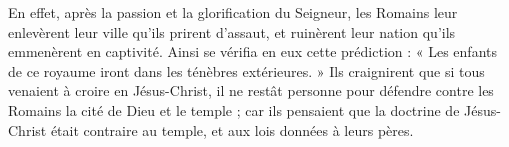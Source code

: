  En effet, après la passion et la glorification du Seigneur, les Romains leur enlevèrent leur ville qu’ils prirent d’assaut, et ruinèrent leur nation qu’ils emmenèrent en captivité. Ainsi se vérifia en eux cette prédiction : « Les enfants de ce royaume iront dans les ténèbres extérieures. » Ils craignirent que si tous venaient à croire en Jésus-Christ, il ne restât personne pour défendre contre les Romains la cité de Dieu et le temple ; car ils pensaient que la doctrine de Jésus-Christ était contraire au temple, et aux lois données à leurs pères.